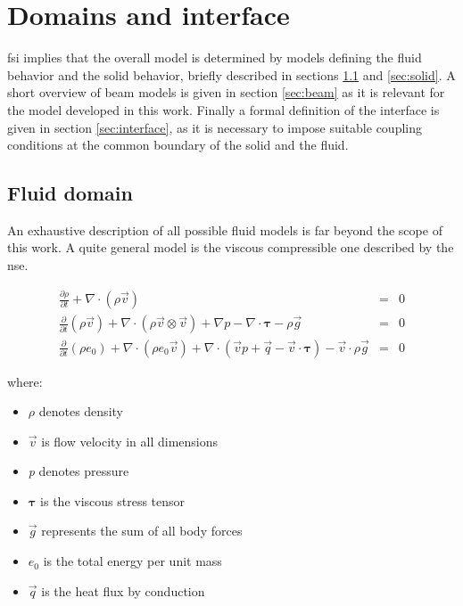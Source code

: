 \section{Domains and interface}
\label{sec:models}

\acrlong{fsi} implies that the overall model is determined by models defining the fluid behavior and the solid behavior, briefly described in sections \ref{sec:fluid} and \ref{sec:solid}. A short overview of beam models is given in section \ref{sec:beam} as it is relevant for the model developed in this work.
Finally a formal definition of the interface is given in section \ref{sec:interface}, as it is necessary to impose suitable coupling conditions at the common boundary of the solid and the fluid.


\subsection{Fluid domain}
\label{sec:fluid}

An exhaustive description of all possible fluid models is far beyond the scope of this work. A quite general model is the viscous compressible one described by the \acrfull{nse}. 

\begin{subequations}
\begin{eqnarray}
	\label{eq:cont}
	\frac{\partial{\rho}}{\partial{t}} + \nabla \cdot \left(\rho \vec{v}\right) &=&  0 \\	
	\label{eq:mom-cons} 
	\frac{\partial }{\partial t}\left( \rho \vec{v} \right) + \nabla \cdot \left( \rho \vec{v} \otimes \vec{v} \right) +\nabla p - \nabla \cdot \mathbf{\tau} - \rho \vec{g} &=& 0 \\
	\label{eq:energy-cons}
	\frac{\partial }{\partial t}\left( \rho e_0  \right) + \nabla \cdot \left( \rho e_0 \vec{v} \right) + \nabla \cdot \left( \vec{v}p + \vec{q} -\vec{v} \cdot \bm{\tau} \right) - \vec{v} \cdot \rho \vec{g} &=& 0
\end{eqnarray}
\end{subequations}

where:
\begin{itemize}
	\item $\rho$ denotes density
	\item $\vec{v}$ is flow velocity in all dimensions
	\item \textit{p} denotes pressure
	\item $\bm{\tau}$ is the viscous stress tensor
	\item $\vec{g}$ represents the sum of all body forces
	\item $e_0$ is the total energy per unit mass
	\item $\vec{q}$ is the heat flux by conduction
\end{itemize}

